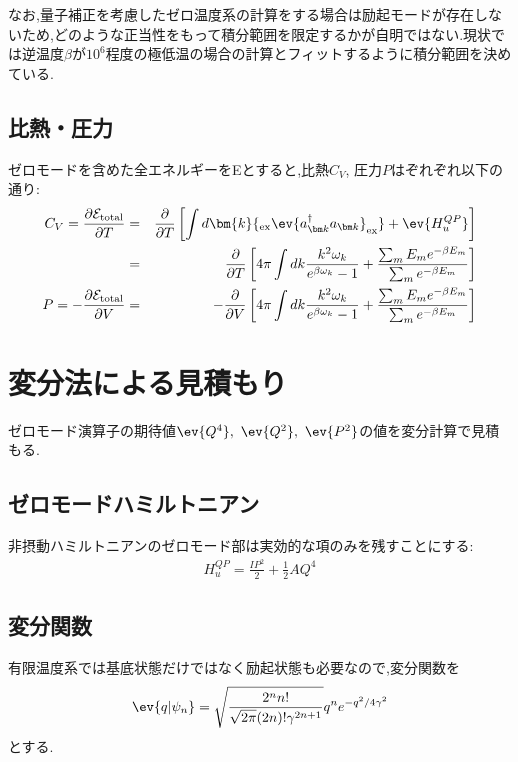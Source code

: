 \documentclass[10.5pt,a4paper]{jreport}
\begin{document}
なお,量子補正を考慮したゼロ温度系の計算をする場合は励起モードが存在しないため,どのような正当性をもって積分範囲を限定するかが自明ではない.現状では逆温度$\beta$が$10^6$程度の極低温の場合の計算とフィットするように積分範囲を決めている.

\subsection{比熱・圧力}
ゼロモードを含めた全エネルギーを{\cal E}とすると,比熱$C_V$, 圧力$P$はぞれぞれ以下の通り:
\begin{eqnarray}
  \nonumber  C_V = \frac{\partial {\cal E}_{\rm total}}{\partial T} &=& \frac{\partial}{\partial T}\left[\int d\bm{k} {_{\rm ex}\ev{a^\dagger_{\bm k} a_{\bm k}}_{\rm ex}} + \ev{H_u^{QP}} \right]\\
  &=& \frac{\partial}{\partial T}\left[4\pi\int dk \frac{k^2\omega_k}{e^{\beta\omega_k}-1} + \frac{\sum_m E_me^{-\beta E_m}}{\sum_m e^{-\beta E_m}}\right]\\
  P = -\frac{\partial {\cal E}_{\rm total}}{\partial V} &=& -\frac{\partial}{\partial V}\left[4\pi\int dk \frac{k^2\omega_k}{e^{\beta\omega_k}-1} + \frac{\sum_m E_me^{-\beta E_m}}{\sum_m e^{-\beta E_m}}\right]
\end{eqnarray}
\section{変分法による見積もり}
ゼロモード演算子の期待値$\ev{Q^4},\ \ev{Q^2},\ \ev{P^2}$の値を変分計算で見積もる.
\subsection{ゼロモードハミルトニアン}
非摂動ハミルトニアンのゼロモード部は実効的な項のみを残すことにする:
\begin{eqnarray}
  H^{QP}_u = \frac{IP^2}{2} + \frac{1}{2}AQ^4
\end{eqnarray}
\subsection{変分関数}
有限温度系では基底状態だけではなく励起状態も必要なので,変分関数を
\begin{eqnarray}
  \ev{q|\psi_n} = \sqrt{\frac{2^nn!}{\sqrt{2\pi}(2n)!\gamma^{2n+1}}} q^ne^{-q^2/4\gamma^2}
\end{eqnarray}
とする.
\end{document}

